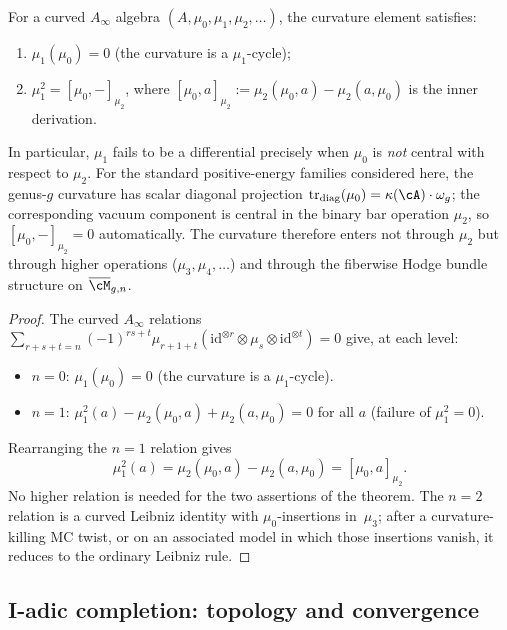 \begin{theorem}
\label{thm:curvature-central}
For a curved $A_\infty$ algebra $(A, \mu_0, \mu_1, \mu_2, \ldots)$, the curvature element satisfies:
\begin{enumerate}
\item $\mu_1(\mu_0) = 0$ \quad (the curvature is a $\mu_1$-cycle);
\item $\mu_1^2 = [\mu_0, -]_{\mu_2}$, where $[\mu_0, a]_{\mu_2} := \mu_2(\mu_0, a) - \mu_2(a, \mu_0)$ is the inner derivation.
\end{enumerate}
In particular, $\mu_1$ fails to be a differential precisely when $\mu_0$
is \emph{not} central with respect to $\mu_2$. For the standard
positive-energy families considered here, the genus-$g$ curvature has
scalar diagonal projection
$\operatorname{tr}_{\mathrm{diag}}(\mu_0)=\kappa(\cA)\cdot\omega_g$;
the corresponding vacuum component is central in the binary bar operation
$\mu_2$, so $[\mu_0, -]_{\mu_2} = 0$ automatically. The curvature
therefore enters not through $\mu_2$ but through higher operations
($\mu_3, \mu_4, \ldots$) and through the fiberwise Hodge bundle
structure on $\overline{\cM}_{g,n}$.
\end{theorem}

\begin{proof}
The curved $A_\infty$ relations $\sum_{r+s+t=n}(-1)^{rs+t}\mu_{r+1+t}(\mathrm{id}^{\otimes r}\otimes \mu_s \otimes \mathrm{id}^{\otimes t})=0$ give, at each level:
\begin{itemize}
\item $n=0$: $\mu_1(\mu_0) = 0$ \quad (the curvature is a $\mu_1$-cycle).
\item $n=1$: $\mu_1^2(a) - \mu_2(\mu_0, a) + \mu_2(a, \mu_0) = 0$ for all $a$ \quad (failure of $\mu_1^2 = 0$).
\end{itemize}

Rearranging the $n=1$ relation gives
\[
\mu_1^2(a)
=\mu_2(\mu_0,a)-\mu_2(a,\mu_0)
=[\mu_0,a]_{\mu_2}.
\]
No higher relation is needed for the two assertions of the theorem.
The $n=2$ relation is a curved Leibniz identity with
$\mu_0$-insertions in~$\mu_3$; after a curvature-killing MC twist, or
on an associated model in which those insertions vanish, it reduces to
the ordinary Leibniz rule.
\end{proof}

\subsection{I-adic completion: topology and convergence}
\label{sec:i-adic-completion}

